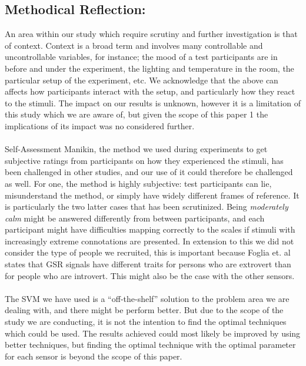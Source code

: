 \subsection{Methodical Reflection:}
An area within our study which require scrutiny and further investigation is
that of context. Context is a broad term and involves many controllable and
uncontrollable variables, for instance; the mood\cite{definition_emotions} of a test participants are in
before and under the experiment, the lighting and temperature in the room, the
particular setup of the experiment, etc. 
We acknowledge that the above can affects how participants interact with the setup, and particularly how they
react to the stimuli. 
The impact on our results is unknown, however it is a limitation of this study which we are aware of, but given the scope of this paper 1 the implications of its impact was no considered further.\\\\
Self-Assessment Manikin, the method we used during experiments to get subjective
ratings from participants on how they experienced the stimuli, has been
challenged in other studies, and our use of it could therefore be challenged as
well. For one, the method is highly subjective: test participants can lie,
misunderstand the method, or simply have widely different frames of
reference. It is particularly the two latter cases that has been
scrutinized. Being \textit{moderately calm} might be answered differently from
between participants, and each participant might have difficulties mapping
correctly to the scales if stimuli with increasingly extreme connotations are
presented.
In extension to this we did not consider the type of people we recruited, this is important because Foglia et. al~\cite{extrovsintro} states that GSR signals have different traits for persons who are extrovert than for people who are introvert. This might also be the case with the other sensors.
\\\\
The SVM we have used is a ``off-the-shelf'' solution to the problem area we are dealing with, and there might be perform better.
But due to the scope of the study we are conducting, it is not the intention to find the optimal techniques which could be used.
The results achieved could most likely be improved by using better techniques, but finding the optimal technique with the optimal parameter for each sensor is beyond the scope of this paper.


